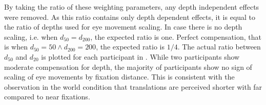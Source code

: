 By taking the ratio of these weighting parameters, any depth independent effects were removed. As this ratio contains only depth dependent effects, it is equal to the ratio of depths used for eye movement scaling. In case there is no depth scaling, i.e. when $d_{50} = d_{200}$, the expected ratio is one. Perfect compensation, that is when $d_{50} = 50  \wedge d_{200} = 200$, the expected ratio is $1/4$. The actual ratio between $d_{50}$ and $d_{20}$ is plotted for each participant in . While two participants show moderate compensation for depth, the majority of participants show no sign of scaling of eye movements by fixation distance. This is consistent with the observation in the world condition that translations are perceived shorter with far compared to near fixations.
